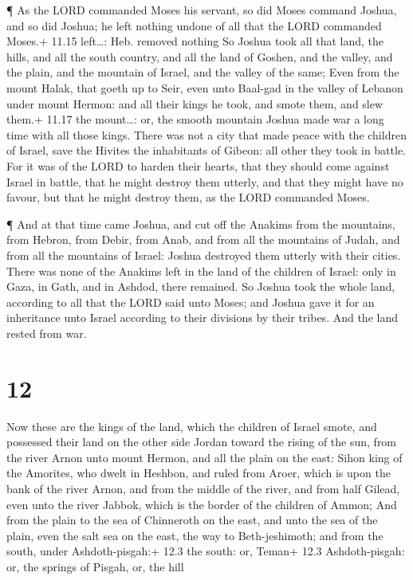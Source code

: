  ¶ As the LORD commanded Moses his servant, so did Moses
command Joshua, and so did Joshua; he left nothing undone of all that
the LORD commanded Moses.+ 11.15 left\ldots: Heb. removed nothing
 So Joshua took all that land, the hills, and all the south
country, and all the land of Goshen, and the valley, and the plain, and
the mountain of Israel, and the valley of the same;  Even
from the mount Halak, that goeth up to Seir, even unto Baal-gad in the
valley of Lebanon under mount Hermon: and all their kings he took, and
smote them, and slew them.+ 11.17 the mount\ldots: or, the smooth
mountain  Joshua made war a long time with all those kings.
 There was not a city that made peace with the children of
Israel, save the Hivites the inhabitants of Gibeon: all other they took
in battle.  For it was of the LORD to harden their hearts,
that they should come against Israel in battle, that he might destroy
them utterly, and that they might have no favour, but that he might
destroy them, as the LORD commanded Moses.

 ¶ And at that time came Joshua, and cut off the Anakims
from the mountains, from Hebron, from Debir, from Anab, and from all the
mountains of Judah, and from all the mountains of Israel: Joshua
destroyed them utterly with their cities.  There was none
of the Anakims left in the land of the children of Israel: only in Gaza,
in Gath, and in Ashdod, there remained.  So Joshua took the
whole land, according to all that the LORD said unto Moses; and Joshua
gave it for an inheritance unto Israel according to their divisions by
their tribes. And the land rested from war.

\hypertarget{section-11}{%
\section{12}\label{section-11}}

 Now these are the kings of the land, which the children of
Israel smote, and possessed their land on the other side Jordan toward
the rising of the sun, from the river Arnon unto mount Hermon, and all
the plain on the east:  Sihon king of the Amorites, who
dwelt in Heshbon, and ruled from Aroer, which is upon the bank of the
river Arnon, and from the middle of the river, and from half Gilead,
even unto the river Jabbok, which is the border of the children of
Ammon;  And from the plain to the sea of Chinneroth on the
east, and unto the sea of the plain, even the salt sea on the east, the
way to Beth-jeshimoth; and from the south, under Ashdoth-pisgah:+ 12.3
the south: or, Teman+ 12.3 Ashdoth-pisgah: or, the springs of Pisgah,
or, the hill

